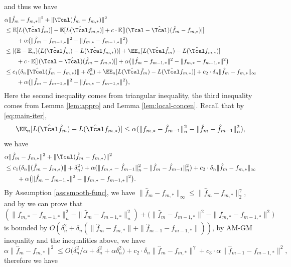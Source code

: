 \documentclass[14pt]{extarticle} %
\begin{document}
and thus we have \begin{align*}
&\alpha \|\hat{f}_m - f_{m,*}\|^2 + \|\Tcal(\hat{f}_m - f_{m,*})\|^2\\
    & \leq \mathbb{E}[L(\hat{\Tcal}\hat{f}_m)] - \mathbb{E}[L(\hat{\Tcal} f_{m,*})] + c\cdot\mathbb{E}[|(\Tcal - \hat{\Tcal})(\hat{f}_m - f_{m,*})|]\\
    &\qquad+ \alpha\big(\|\hat{f}_m - f_{m-1,*}\|^2 - \|f_{m,*} - f_{m-1,*}\|^2\big)\\
    & \leq |(\mathbb{E} - \mathbb{E}_n)(L(\hat{\Tcal}\hat{f}_m) - L(\hat{\Tcal} f_{m,*}) )| + \EE_n[L(\hat{\Tcal}\hat{f}_m) - L(\hat{\Tcal} f_{m,*})] \\
    &\qquad+ c\cdot\mathbb{E}[|(\Tcal - \hat{\Tcal})(\hat{f}_m - f_{m,*})|] +  \alpha\big(\|\hat{f}_m - f_{m-1,*}\|^2 - \|f_{m,*} - f_{m-1,*}\|^2\big)\\
    &\leq c_1 (\delta_n\|\hat{\Tcal}(\hat{f}_m - f_{m,*})\| + \delta_n^2)+ \EE_n[L(\hat{\Tcal}\hat{f}_m) - L(\hat{\Tcal} f_{m,*})] + c_2\cdot\delta_n \|\hat{f}_m - f_{m,*}\|_\infty \\
    &\qquad +  \alpha\big(\|\hat{f}_m - f_{m-1,*}\|^2 - \|f_{m,*} - f_{m-1,*}\|^2\big),\\
\end{align*}
Here the second inequality comes from triangular inequality, the third inequality comes from Lemma \ref{lem:appro} and Lemma \ref{lem:local-concen}.
Recall that by \eqref{eq:main-iter},  $$
 \EE_n[L(\hat{\Tcal}\hat{f}_m) - L(\hat{\Tcal} f_{m,*})] \leq  \alpha(\|f_{m,*} - \hat{f}_{m-1}\|^2_n - \|\hat{f}_m - \hat{f}_{m-1}\|^2_n),
$$
we have \begin{align*}
&\alpha \|\hat{f}_m - f_{m,*}\|^2 + \|\Tcal(\hat{f}_m - f_{m,*})\|^2\\
&\leq c_1 (\delta_n\|(\hat{f}_m - f_{m,*})\| + \delta_n^2) + \alpha(\|f_{m,*} - \hat{f}_{m-1}\|^2_n - \|\hat{f}_m - \hat{f}_{m-1}\|^2_n) + c_2\cdot\delta_n \|\hat{f}_m - f_{m,*}\|_\infty \\
&\qquad +  \alpha\big(\|\hat{f}_m - f_{m-1,*}\|^2 - \|f_{m,*} - f_{m-1,*}\|^2\big).
\end{align*}
By Assumption \ref{ass:smooth-func}, we have $\|\hat{f}_m - f_{m,*}\|_\infty \leq\|\hat{f}_m - f_{m,*}\|_2^\gamma $, and by \cite{bennett2023source} we can prove that $$
(\|f_{m,*} - f_{m-1,*}\|^2_n - \|\hat{f}_m - f_{m-1,*}\|^2_n) +\big(\|\hat{f}_m - f_{m-1,*}\|^2 - \|f_{m,*} - f_{m-1,*}\|^2\big)
$$
is bounded by $O(\delta_n^2 + \delta_n(\|\hat{f}_m - f_{m,*}\| + \|\hat{f}_{m-1} - f_{m-1,*}\|))$, by AM-GM inequality and the inequalities above, we have $$
\alpha\|\hat{f}_m - f_{m,*}\|^2 \leq O\big(\delta_n^2/\alpha + \delta_n^2 + 
\alpha\delta_n^2\big) + c_2\cdot\delta_n \|\hat{f}_m - f_{m,*}\|^\gamma + c_3\cdot \alpha\|\hat{f}_{m-1} - f_{m-1,*}\|^2,
$$
therefore we have 
\end{document}
